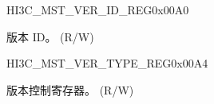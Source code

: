 \begin{register}{H}{I3C\_MST\_VER\_ID\_REG}{0x00A0}\label{regdesc:I3CMSTVERIDREG}
%
\regnewline%
\begin{regdesc}\begin{reglist}
\label{fielddesc:I3CMSTREGI3CMSTVERID}\item [I3C\_MST\_REG\_I3C\_MST\_VER\_ID] 版本 ID。 (R/W)
\end{reglist}\end{regdesc}
\end{register}


\begin{register}{H}{I3C\_MST\_VER\_TYPE\_REG}{0x00A4}\label{regdesc:I3CMSTVERTYPEREG}
%
\regnewline%
\begin{regdesc}\begin{reglist}
\label{fielddesc:I3CMSTREGI3CMSTVERTYPE}\item [I3C\_MST\_REG\_I3C\_MST\_VER\_TYPE] 版本控制寄存器。 (R/W)
\end{reglist}\end{regdesc}
\end{register}
